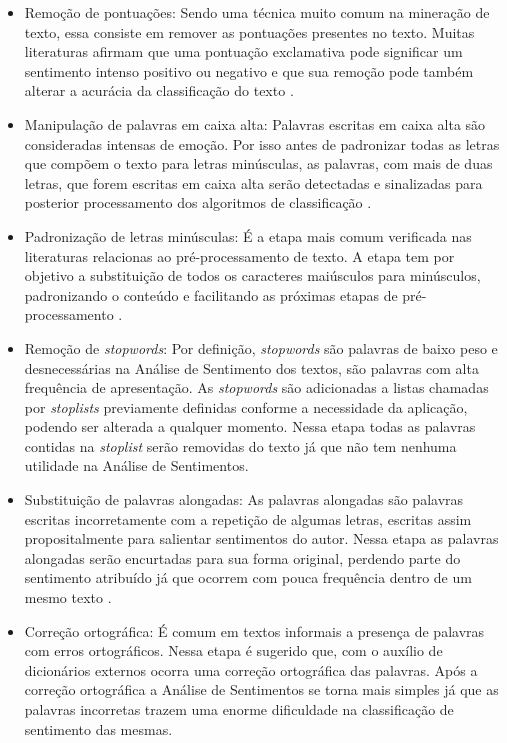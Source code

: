 \begin{itemize}
\item Remoção de pontuações: Sendo uma técnica muito comum na mineração de texto, essa consiste em remover as pontuações presentes no texto. Muitas literaturas afirmam que uma pontuação exclamativa pode significar um sentimento intenso positivo ou negativo e que sua remoção pode também alterar a acurácia da classificação do texto \cite{Lin2009}.

\item Manipulação de palavras em caixa alta: Palavras escritas em caixa alta são consideradas intensas de emoção. Por isso antes de padronizar todas as letras que compõem o texto para letras minúsculas, as palavras, com mais de duas letras, que forem escritas em caixa alta serão detectadas e sinalizadas para posterior processamento dos algoritmos de classificação .

\item Padronização de letras minúsculas: É a etapa mais comum verificada nas literaturas relacionas ao pré-processamento de texto. A etapa tem por objetivo a substituição de todos os caracteres maiúsculos para minúsculos, padronizando o conteúdo e facilitando as próximas etapas de pré-processamento \cite{DBLP:conf/coling/SantosG14}.

\item Remoção de \textit{stopwords}: Por definição, \textit{stopwords} são palavras de baixo peso e desnecessárias na Análise de Sentimento dos textos, são palavras com alta frequência de apresentação.  As \textit{stopwords} são adicionadas a listas chamadas por \textit{stoplists} previamente definidas conforme a necessidade da aplicação, podendo ser alterada a qualquer momento. Nessa etapa todas as palavras contidas na \textit{stoplist} serão removidas do texto já que não tem nenhuma utilidade na Análise de Sentimentos.

\item Substituição de palavras alongadas: As palavras alongadas são palavras escritas incorretamente com a repetição de algumas letras, escritas assim propositalmente para salientar sentimentos do autor. Nessa etapa as palavras alongadas serão encurtadas para sua forma original, perdendo parte do sentimento atribuído já que ocorrem com pouca frequência dentro de um mesmo texto \cite{Mohammad2015}.

\item Correção ortográfica: É comum em textos informais a presença de palavras com erros ortográficos. Nessa etapa é sugerido que, com o auxílio de dicionários externos ocorra uma correção ortográfica das palavras. Após a correção ortográfica a Análise de Sentimentos se torna mais simples já que as palavras incorretas trazem uma enorme dificuldade na classificação de sentimento das mesmas.


\end{itemize}
